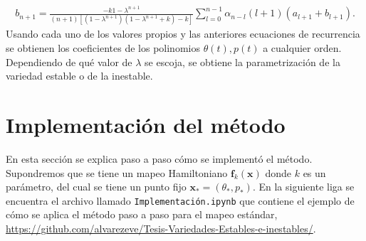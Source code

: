\begin{eqnarray}
b_{n+1}=\frac{-k 1-\lambda^{n+1}}{(n+1)[(1-\lambda^{n+1})(1-\lambda^{n+1}+k)-k]}\sum_{l=0}^{n-1}\alpha_{n-l}(l+1)(a_{l+1}+b_{l+1}).
\end{eqnarray}
Usando cada uno de los valores propios y las anteriores ecuaciones de recurrencia se obtienen los coeficientes de los polinomios $\theta(t),p(t)$ a cualquier orden. Dependiendo de qué valor de $\lambda$ se escoja, se obtiene la parametrización de la variedad estable o de la inestable.\\






\section{Implementación del método}
En esta sección se explica paso a paso cómo se implementó el método. Su\-pon\-dre\-mos que se tiene un mapeo Hamiltoniano $\mathbf{f}_{k}(\mathbf{x})$ donde $k$  es un parámetro, del cual se tiene un punto fijo $\mathbf{x}_{*}=(\theta_{*},p_{*})$. En la siguiente liga se encuentra el archivo llamado \texttt{Implementación.ipynb} que contiene el ejemplo de cómo se aplica el método paso a paso para el mapeo estándar, \url{https://github.com/alvarezeve/Tesis-Variedades-Estables-e-inestables/}. 
\linebreak


